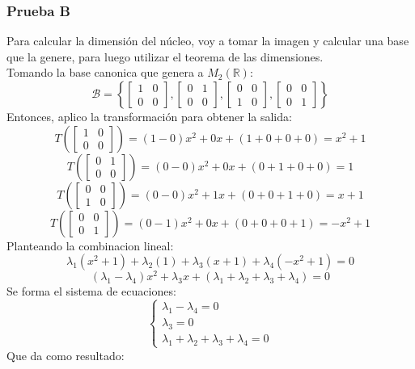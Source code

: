 \documentclass[a4paper,12pt]{article}
\begin{document}
\subsubsection{Prueba B}
Para calcular la dimensión del núcleo, voy a tomar la imagen y calcular una base que la genere, para luego utilizar el teorema de las dimensiones. \\
Tomando la base canonica que genera a $M_2(\mathds{R})$:
$$
\mathcal{B}=\left \{ \begin{bmatrix} 1 & 0 \\ 0 & 0 \end{bmatrix}, \begin{bmatrix} 0 & 1 \\ 0 & 0 \end{bmatrix}, \begin{bmatrix} 0 & 0 \\ 1 & 0 \end{bmatrix}, \begin{bmatrix} 0 & 0 \\ 0 & 1 \end{bmatrix} \right \}
$$
Entonces, aplico la transformación para obtener la salida:
$$
T \left ( \begin{bmatrix} 1 & 0 \\ 0 & 0 \end{bmatrix} \right ) = (1-0)x^2+0x+(1+0+0+0)=x^2+1
$$
$$
T \left ( \begin{bmatrix} 0 & 1 \\ 0 & 0 \end{bmatrix} \right ) = (0-0)x^2+0x+(0+1+0+0)=1
$$
$$
T \left ( \begin{bmatrix} 0 & 0 \\ 1 & 0 \end{bmatrix} \right ) = (0-0)x^2+1x+(0+0+1+0)=x+1
$$
$$
T \left ( \begin{bmatrix} 0 & 0 \\ 0 & 1 \end{bmatrix} \right ) = (0-1)x^2+0x+(0+0+0+1)=-x^2+1
$$
Planteando la combinacion lineal:
$$
\lambda_1(x^2+1)+\lambda_2(1)+\lambda_3(x+1)+\lambda_4(-x^2+1)=0
$$
$$
(\lambda_1-\lambda_4)x^2+\lambda_3x+(\lambda_1+\lambda_2+\lambda_3+\lambda_4)=0
$$
Se forma el sistema de ecuaciones:
$$
\begin{cases}
    \lambda_1-\lambda_4=0 \\
    \lambda_3=0 \\
    \lambda_1+\lambda_2+\lambda_3+\lambda_4=0
\end{cases}
$$
Que da como resultado:
\end{document}
